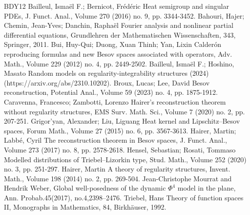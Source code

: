 \documentclass[10pt]{amsart}
\theoremstyle{definition}
\numberwithin{equation}{section}
\begin{document}
\begin{thebibliography}{BDY12}
 Bailleul, Ismaël F.; Bernicot, Frédéric Heat semigroup and singular PDEs, J. Funct. Anal., Volume 270 (2016) no. 9, pp. 3344-3452.
 Bahouri, Hajer; Chemin, Jean-Yves; Danchin, Raphaël Fourier analysis and nonlinear partial differential equations, Grundlehren der Mathematischen Wissenschaften, 343, Springer, 2011.
 Bui, Huy-Qui; Duong, Xuan Thinh; Yan, Lixin Calderón reproducing formulas and new Besov spaces associated with operators, Adv. Math., Volume 229 (2012) no. 4, pp. 2449-2502.
 Bailleul, Ismaël F.; Hoshino, Masato Random models on regularity-integrability structures (2024) (https://arxiv.org/abs/2310.10202).
 Broux, Lucas; Lee, David Besov reconstruction, Potential Anal., Volume 59 (2023) no. 4, pp. 1875-1912.
 Caravenna, Francesco; Zambotti, Lorenzo Hairer’s reconstruction theorem without regularity structures, EMS Surv. Math. Sci., Volume 7 (2020) no. 2, pp. 207-251.
 Grigor’yan, Alexander; Liu, Liguang Heat kernel and Lipschitz–Besov spaces, Forum Math., Volume 27 (2015) no. 6, pp. 3567-3613.
 Hairer, Martin; Labbé, Cyril The reconstruction theorem in Besov spaces, J. Funct. Anal., Volume 273 (2017) no. 8, pp. 2578-2618.
 Hensel, Sebastian; Rosati, Tommaso Modelled distributions of Triebel–Lizorkin type, Stud. Math., Volume 252 (2020) no. 3, pp. 251-297.
 Hairer, Martin A theory of regularity structures, Invent. Math., Volume 198 (2014) no. 2, pp. 269-504.
 Jean-Christophe Mourrat and Hendrik Weber, Global well-posedness of the dynamic $\Phi^4$ model in the plane, Ann. Probab.45(2017), no.4,2398–2476.
 Triebel, Hans Theory of function spaces II, Monographs in Mathematics, 84, Birkhäuser, 1992.
\end{thebibliography}
\end{document}
